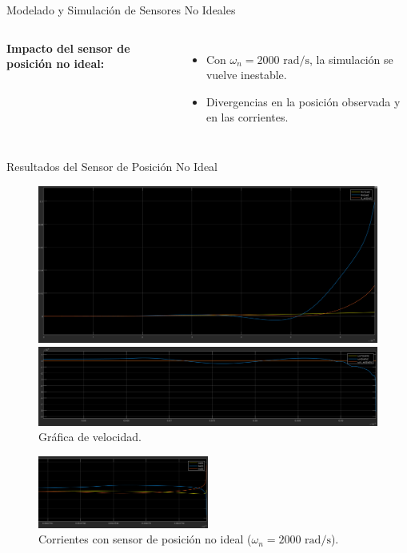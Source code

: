 \documentclass[12pt]{beamer}
\begin{document}
\begin{frame}{Modelado y Simulación de Sensores No Ideales}
\begin{columns}
        \textbf{Impacto del sensor de posición no ideal:}
        \begin{itemize}
            \item Con \(\omega_n = 2000 \text{ rad/s}\), la simulación se vuelve inestable.
            \item Divergencias en la posición observada y en las corrientes.
        \end{itemize}
    \end{columns}
\end{frame}

\begin{frame}{Resultados del Sensor de Posición No Ideal}
    \begin{figure}
        \centering
        \begin{minipage}{0.48\textwidth}
            \includegraphics[width=\textwidth]{Imagenes/1_posNI_2000_p.png}
            \caption{Gráfica de posición.}
        \end{minipage}
        \hfill
        \begin{minipage}{0.48\textwidth}
            \includegraphics[width=\textwidth]{Imagenes/2_posNI_2000_w.png}
            \caption{Gráfica de velocidad.}
        \end{minipage}
    \end{figure}

    \begin{figure}
        \centering
        \includegraphics[width=0.5\textwidth]{Imagenes/3_posNI_2000_c.png}
        \caption{Corrientes con sensor de posición no ideal (\(\omega_n = 2000 \text{ rad/s}\)).}
    \end{figure}
\end{frame}
\end{document}
